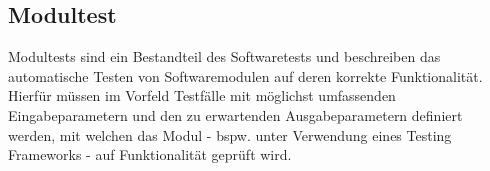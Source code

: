 \subsection{Modultest}
Modultests sind ein Bestandteil des Softwaretests \cite{swtestwiki} und beschreiben das automatische Testen von Softwaremodulen auf deren korrekte Funktionalität. Hierfür müssen im Vorfeld Testfälle mit möglichst umfassenden Eingabeparametern und den zu erwartenden Ausgabeparametern definiert werden, mit welchen das Modul - bspw. unter Verwendung eines Testing Frameworks - auf Funktionalität geprüft wird. \cite{modultestwiki}
